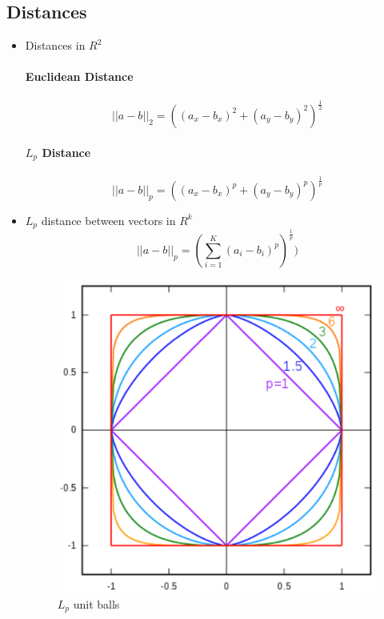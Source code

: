 \documentclass[11pt]{article}
\begin{document}
\subsection{Distances}
\begin{itemize}
	\item Distances in $R^2$
		\paragraph{Euclidean Distance}
		\begin{equation}
			||a-b||_2 = ((a_x - b_x)^2 + (a_y - b_y)^{2})^\frac{1}{2}
		\end{equation}

		\paragraph{$L_p$ Distance}
		\begin{equation}
			||a-b||_p = ((a_x - b_x)^p + (a_y - b_y)^{p})^\frac{1}{p}
		\end{equation}

\item $L_p$ distance between vectors in $R^k$
		\begin{equation}
			||a-b||_p = (\sum_{i=1}^K (a_i - b_i)^p)^{\frac{1}{p}})
			\end{equation}



\begin{figure}[H]
\includegraphics[scale=0.3]{res/images/lp.png}
\centering
\caption{$L_p$ unit balls}
\label{}
\end{figure}
\end{itemize}
\end{document}
